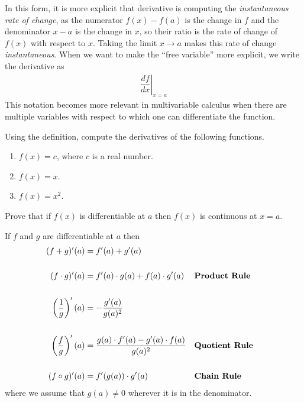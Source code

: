 In this form, it is more explicit that derivative is computing the {\it instantaneous rate of change}, as the numerator $f(x) - f(a)$ is the change in $f$ and the denominator $x - a$ is the change in $x$, so their ratio is the rate of change of $f(x)$ with respect to $x$. Taking the limit $x \rightarrow a$ makes this rate of change {\it instantaneous}. When we want to make the ``free variable'' more explicit, we write the derivative as
\begin{align*}
	\left.\dfrac{df}{dx}\right|_{x = a}
\end{align*}
This notation becomes more relevant in multivariable calculus when there are multiple variables with respect to which one can differentiate the function.

\begin{exercise}
	\label{q:derivatives_1}
	Using the definition, compute the derivatives of the following functions.
	\begin{enumerate}
		\item $f(x) = c$, where $c$ is a real number.
		\item $f(x) = x$.
		\item $f(x) = x^2$.
	\end{enumerate}
\end{exercise}

\begin{exercise}
	Prove that if $f(x)$ is differentiable at $a$ then $f(x)$ is continuous at $x = a$.
\end{exercise}

\begin{theorem}
	\label{thm:derivative_rules}
	If $f$ and $g$ are differentiable at $a$ then\\
	\begin{align*}
		(f+g)'(a)                     & = f'(a) + g'(a)                                                                     \\\\
		(f\cdot g)'(a)                & = f'(a) \cdot g(a) + f(a) \cdot g'(a)                 &  & \mbox{\bf Product Rule}  \\\\
		\left(\dfrac{1}{g}\right)'(a) & = -\dfrac{g'(a)}{g(a)^2}                                                            \\\\
		\left(\dfrac{f}{g}\right)'(a) & = \dfrac{g(a) \cdot f'(a) - g'(a) \cdot f(a)}{g(a)^2} &  & \mbox{\bf Quotient Rule} \\\\
		(f\circ g)'(a)
		                              & = f'(g(a)) \cdot g'(a)                                &  & \mbox{\bf Chain Rule}    \\
	\end{align*}
	where we assume that $g(a) \neq 0$ wherever it is in the denominator.\\
\end{theorem}

